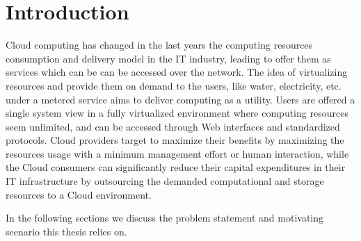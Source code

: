 \chapter{Introduction}
\label{chap:introduction}

Cloud computing has changed in the last years the computing resources consumption and delivery model in the IT industry, leading to offer them as services which can be can be accessed over the network. The idea of virtualizing resources and provide them on demand to the users, like water, electricity, etc. under a metered service aims to deliver computing as a utility. Users are offered a single system view in a fully virtualized environment where computing resources seem unlimited, and can be accessed through Web interfaces and standardized protocols. Cloud providers target to maximize their benefits by maximizing the resources usage with a minimum management effort or human interaction, while the Cloud consumers can significantly reduce their capital expenditures in their IT infrastructure by outsourcing the demanded computational and storage resources to a Cloud environment.

In the following sections we discuss the problem statement and motivating scenario this thesis relies on. 




